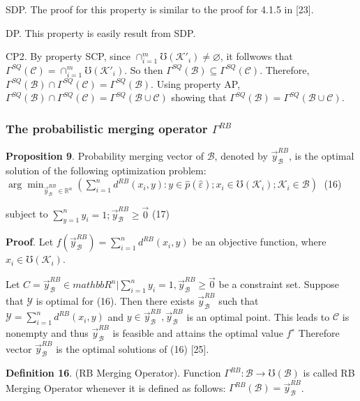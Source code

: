 \documentclass[10pt,a4paper]{IOS-Book-Article}
\begin{document}
SDP. The proof for this property is similar to the proof for 4.1.5 in [23].

DP. This property is easily result from SDP. 

CP2. By property SCP, since $\cap^m_{i=1}\mho(\mathcal{K}'_i) \neq \varnothing$,
it follwows that $\Gamma^{SQ}(\mathcal{C}) = \cap^m_{i=1}\mho(\mathcal{K}'_i)$. So then
$\Gamma^{SQ}(\mathcal{B}) \subseteq \Gamma^{SQ}(\mathcal{C})$. Therefore, $\Gamma^{SQ}(\mathcal{B}) \cap \Gamma^{SQ}(\mathcal{C}) =
\Gamma^{SQ}(\mathcal{B})$. Using property AP, $\Gamma^{SQ}(\mathcal{B}) \cap \Gamma^{SQ}(\mathcal{C}) = \Gamma^{SQ}(\mathcal{B} \cup \mathcal{C})$
showing that $\Gamma^{SQ}(\mathcal{B}) = \Gamma^{SQ}(\mathcal{B} \cup \mathcal{C})$.

\subsubsection{The probabilistic merging operator $\Gamma ^{RB}$}
\textbf{Proposition 9}. Probability merging vector of $\mathcal{B}$,
denoted by $\vec{y}^{RB}_\mathcal{B}$, is the optimal solution of the following optimization problem:
$\arg \min_{\vec{y}^{RB}_\mathcal{B} \in \mathbb{R}^n} \left( \sum^n_{i=1} d^{RB}(x_i, y) :
y \in \hat{p}(\hat{\varepsilon}); x_i \in \mho(\mathcal{K}_i);\mathcal{K}_i \in \mathcal{B} \right)$ (16)

subject to $\sum^n_{y=1} y_i= 1; \vec{y}^{RB}_\mathcal{B} \geq \vec{0}$ (17)

\textbf{Proof}. Let $f(\vec{y}^{RB}_\mathcal{B}) = \sum^n_{i=1} d^{RB}(x_i,y)$ be an objective function, where $x_i \in \mho(\mathcal{K}_i)$.

Let $C = { \vec{y}^{RB}_\mathcal{B} \in mathbb{R}^n|\sum^n_{i=1} y_i = 1, \vec{y}^{RB}_\mathcal{B} \geq \vec{0} }$ be
a constraint set. Suppose that $\mathcal{Y}$ is optimal for (16).
Then there exists $\vec{y}^{RB}_\mathcal{B}$ such that $\mathcal{Y} = \sum^n_{i=1} d^{RB}(x_i, y)$
and $y \in \vec{y}^{RB}_\mathcal{B} , \vec{y}^{RB}_\mathcal{B}$ is an optimal point. This leads to $\mathcal{C}$
is nonempty and thus $\vec{y}^{RB}_\mathcal{B}$ is feasible and attains the
optimal value $f^∗$ Therefore vector $\vec{y}^{RB}_\mathcal{B}$ is the optimal
solutions of (16) [25].

\textbf{Definition 16}. (RB Merging Operator). Function 
$\Gamma^{RB} : \mathcal{B} \to \mho(\mathcal{B})$ is called RB Merging Operator
whenever it is defined as follows: $\Gamma^{RB}(\mathcal{B}) = \vec{y}^{RB}_\mathcal{B}$.
\end{document}
